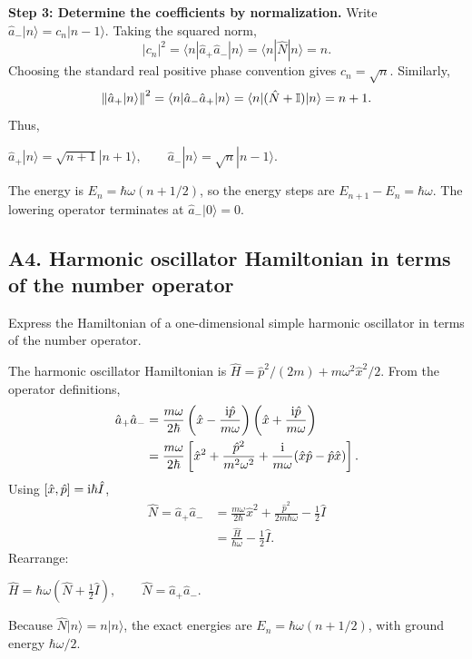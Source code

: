 \documentclass[11pt,a4paper]{article}
\newcommand{\key}[1]{\begin{resultbox}\centering\(\displaystyle #1\)\end{resultbox}}
\newcommand{\bra}[1]{\langle #1|}\newcommand{\ket}[1]{|#1\rangle}
\newcommand{\norm}[1]{\left\lVert#1\right\rVert}
\begin{document}
\textbf{Step 3: Determine the coefficients by normalization.} Write \(\hat a_-\ket n=c_n\ket{n-1}\). Taking the squared norm,
\begin{equation}|c_n|^2=\bra n\hat a_+\hat a_-\ket n=\bra n\hat N\ket n=n.\end{equation}
Choosing the standard real positive phase convention gives \(c_n=\sqrt n\). Similarly,
\begin{equation}\norm{\hat a_+\ket n}^2=\bra n\hat a_-\hat a_+\ket n=\bra n(\hat N+\id)\ket n=n+1.\end{equation}
Thus,
\key{\boxed{\hat a_+\ket n=\sqrt{n+1}\ket{n+1},\qquad\hat a_-\ket n=\sqrt n\ket{n-1}.}}
The energy is \(E_n=\hbar\omega(n+1/2)\), so the energy steps are \(E_{n+1}-E_n=\hbar\omega\). The lowering operator terminates at \(\hat a_-\ket0=0\).

\subsection{A4. Harmonic oscillator Hamiltonian in terms of the number operator}
\begin{questionbox}
Express the Hamiltonian of a one-dimensional simple harmonic oscillator in terms of the number operator.
\end{questionbox}
The harmonic oscillator Hamiltonian is \(\hat H=\hat p^2/(2m)+m\omega^2\hat x^2/2\). From the operator definitions,
\begin{align}
\hat a_+\hat a_-
&=\frac{m\omega}{2\hbar}\left(\hat x-\frac{\mathrm{i}\hat p}{m\omega}\right)\left(\hat x+\frac{\mathrm{i}\hat p}{m\omega}\right)\\
&=\frac{m\omega}{2\hbar}\left[\hat x^2+\frac{\hat p^2}{m^2\omega^2}+\frac{\mathrm{i}}{m\omega}(\hat x\hat p-\hat p\hat x)\right].
\end{align}
Using \([\hat x,\hat p]=\mathrm{i}\hbar\hat I\),
\begin{align}
\hat N=\hat a_+\hat a_-&=\frac{m\omega}{2\hbar}\hat x^2+\frac{\hat p^2}{2m\hbar\omega}-\frac12\hat I\\
&=\frac{\hat H}{\hbar\omega}-\frac12\hat I.
\end{align}
Rearrange:
\key{\boxed{\hat H=\hbar\omega\left(\hat N+\frac12\hat I\right),\qquad\hat N=\hat a_+\hat a_-.}}
Because \(\hat N\ket n=n\ket n\), the exact energies are \(E_n=\hbar\omega(n+1/2)\), with ground energy \(\hbar\omega/2\).
\end{document}
